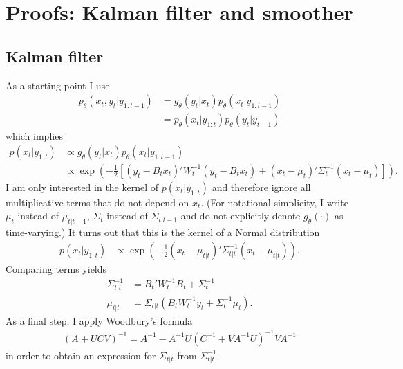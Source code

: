 \documentclass[12pt,a4paper]{scrartcl}
\begin{document}
\appendix 

\section{Proofs: Kalman filter and smoother}

\subsection{Kalman filter}

As a starting point I use 
\begin{align*}
p_\theta(x_t, y_t|y_{1:t-1}) 
&= g_\theta(y_t|x_t) p_\theta(x_t|y_{1:t-1})\\
&= p_\theta(x_t|y_{1:t}) p_\theta(y_t|y_{t-1})
\end{align*}
which implies
\begin{align*}
p(x_t|y_{1:t}) 
&\propto g_\theta(y_t|x_t) p_\theta(x_t|y_{1:t-1}) \\
&\propto \exp\left(-\frac{1}{2}\left[(y_t-B_t x_t)'W_t^{-1}(y_t-B_t x_t) + (x_t-\mu_t)'\Sigma_{t}^{-1}(x_t-\mu_t)\right]\right).
\end{align*}
I am only interested in the kernel of $p(x_t|y_{1:t})$ and therefore ignore all multiplicative terms that do not depend on $x_t$. (For notational simplicity, I write $\mu_t$ instead of $\mu_{t|t-1}$, $\Sigma_t$ instead of $\Sigma_{t|t-1}$ and do not explicitly denote $g_\theta(\cdot)$ as time-varying.) It turns out that this is the kernel of a Normal distribution
\begin{align*}
p(x_t|y_{1:t})&\propto \exp\left(-\frac{1}{2}(x_t-\mu_{t|t})'\Sigma_{t|t}^{-1}(x_t-\mu_{t|t})\right).
\end{align*}
Comparing terms yields
\begin{align*}
\Sigma_{t|t}^{-1} &= B_t'W_t^{-1}B_t + \Sigma_t^{-1}\\
\mu_{t|t} &= \Sigma_{t|t}(B_t W_t^{-1} y_t + \Sigma_t^{-1}\mu_t).
\end{align*}
As a final step, I apply Woodbury's formula
\begin{align*}
(A + UCV)^{-1} = A^{-1} - A^{-1} U (C^{-1} + V A^{-1} U)^{-1} V A^{-1} 
\end{align*} %
in order to obtain an expression for $\Sigma_{t|t}$ from $\Sigma_{t|t}^{-1}$.



\end{document}
